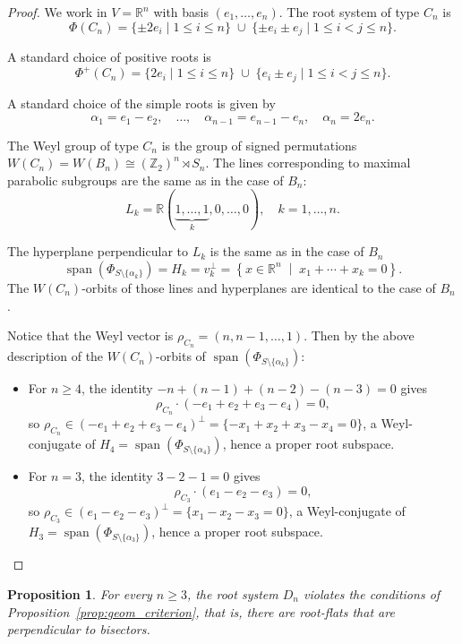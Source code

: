 \documentclass[11pt]{amsart}
\DeclareMathOperator{\Span}{span}
\theoremstyle{plain}
\newtheorem{prop}[thm]{Proposition}
\theoremstyle{definition}
\theoremstyle{remark}
\begin{document}
	\begin{proof}
		We work in $V = \mathbb{R}^n$ with basis $(e_1,\dots,e_n)$. The root system of type $C_n$ is
		\[\Phi(C_n)
		=
		\{ \pm 2e_i \mid 1 \le i \le n \}
		\;\cup\;
		\{ \pm e_i \pm e_j \mid 1 \le i < j \le n \}.
		\]
		
		A standard choice of positive roots is
		\[
		\Phi^+(C_n)
		=
		\{ 2e_i \mid 1 \le i \le n \}
		\;\cup\;
		\{ e_i \pm e_j \mid 1 \le i < j \le n \}.
		\]
		
		A standard choice of the simple roots is given by
		\[
		\alpha_1 = e_1 - e_2,\quad \dots,\quad
		\alpha_{n-1} = e_{n-1} - e_n,\quad
		\alpha_n = 2e_n.
		\]
		
		The Weyl group of type $C_n$ is the group of signed permutations $ W(C_n) = W(B_n) \cong (\mathbb{Z}_2)^n \rtimes S_n$.  The lines corresponding to maximal parabolic subgroups are the same as in the case of $B_n$:
		\[
		L_k = \mathbb{R}(\underbrace{1,\dots,1}_{k},0,\dots,0), \quad k=1,\dots,n.
		\]
		
		The hyperplane perpendicular to $L_k$ is the same as in the case of $B_n$
		\[
		\Span(\Phi_{S\setminus\{\alpha_k\}}) = H_k = v_k^\perp
		=
		\left\{ x \in \mathbb{R}^n \;\middle|\; x_1 + \cdots + x_k = 0 \right\}.
		\]
		The $W(C_n)$-orbits of those lines and hyperplanes are identical to the case of $B_n$.
		
		Notice that the Weyl vector is $\rho_{C_n}=(n,n-1,\dots,1)$. Then by the above description of the $W(C_n)$-orbits of $\Span(\Phi_{S\setminus\{\alpha_k\}})$:
		\begin{itemize}
			\item For $n\ge 4$, the identity $-n+(n-1)+(n-2)-(n-3)=0$ gives
			\[
			\rho_{C_n}\cdot(-e_1+e_2+e_3-e_4)=0,
			\]
			so $\rho_{C_n}\in(-e_1+e_2+e_3-e_4)^\perp=\{-x_1+x_2+x_3-x_4=0\}$, a Weyl-conjugate of $H_4=\Span(\Phi_{S\setminus\{\alpha_4\}})$, hence a proper root subspace.
			\item For $n=3$, the identity $3-2-1=0$ gives
			\[
			\rho_{C_3}\cdot(e_1-e_2-e_3)=0,
			\]
			so $\rho_{C_3}\in(e_1-e_2-e_3)^\perp=\{x_1-x_2-x_3=0\}$, a Weyl-conjugate of $H_3=\Span(\Phi_{S\setminus\{\alpha_3\}})$, hence a proper root subspace.
		\end{itemize}
	\end{proof}
	
	\begin{prop}\label{prop:Dn} 
		For every $n\ge 3$, the root system $D_n$ violates the conditions of Proposition~\ref{prop:geom_criterion}, that is, there are root-flats that are perpendicular to bisectors.
	\end{prop}
	
\end{document}
